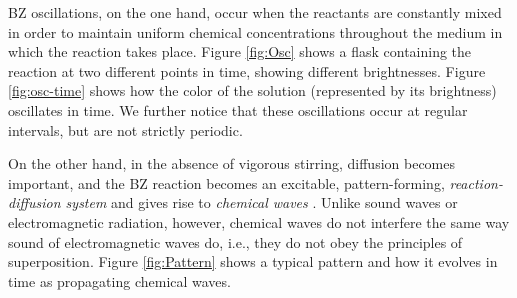 \documentclass[twocolumn,amsmath,amssymb,aps]{revtex4}
\begin{document}
BZ oscillations, on the one hand, occur when the reactants are constantly mixed in order to maintain uniform chemical concentrations throughout the medium in which the reaction takes place.  Figure \ref{fig:Osc} shows a flask containing the reaction at two different points in time, showing different brightnesses. Figure \ref{fig:osc-time} shows how the color of the solution (represented by its brightness) oscillates in time. We further notice that these oscillations occur at regular intervals, but are not strictly periodic. 


On the other hand, in the absence of vigorous stirring, diffusion becomes important, and the BZ reaction becomes an excitable, pattern-forming, \textit{reaction-diffusion system} and gives rise to \textit{chemical waves} \cite{ball1999self}. Unlike sound waves or electromagnetic radiation, however, chemical waves do not interfere the same way sound of electromagnetic waves do, i.e., they do not obey the principles of superposition.  Figure \ref{fig:Pattern} shows a typical pattern and how it evolves in time as propagating chemical waves. 
\end{document}
